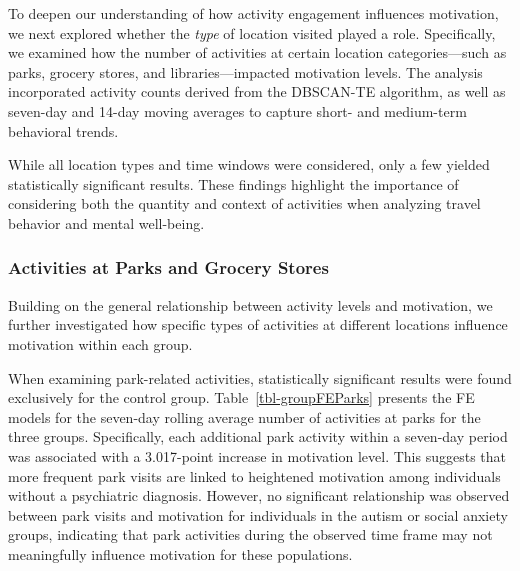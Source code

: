 \documentclass[
  letterpaper,
  number,
  review,
  3p]{elsarticle}
\begin{document}
To deepen our understanding of how activity engagement influences
motivation, we next explored whether the \emph{type} of location visited
played a role. Specifically, we examined how the number of activities at
certain location categories---such as parks, grocery stores, and
libraries---impacted motivation levels. The analysis incorporated
activity counts derived from the DBSCAN-TE algorithm, as well as
seven-day and 14-day moving averages to capture short- and medium-term
behavioral trends.

While all location types and time windows were considered, only a few
yielded statistically significant results. These findings highlight the
importance of considering both the quantity and context of activities
when analyzing travel behavior and mental well-being.

\subsubsection{Activities at Parks and Grocery
Stores}\label{activities-at-parks-and-grocery-stores}

Building on the general relationship between activity levels and
motivation, we further investigated how specific types of activities at
different locations influence motivation within each group.

When examining park-related activities, statistically significant
results were found exclusively for the control group.
Table~\ref{tbl-groupFEParks} presents the FE models for the seven-day
rolling average number of activities at parks for the three groups.
Specifically, each additional park activity within a seven-day period
was associated with a 3.017-point increase in motivation level. This
suggests that more frequent park visits are linked to heightened
motivation among individuals without a psychiatric diagnosis. However,
no significant relationship was observed between park visits and
motivation for individuals in the autism or social anxiety groups,
indicating that park activities during the observed time frame may not
meaningfully influence motivation for these populations.
\end{document}

